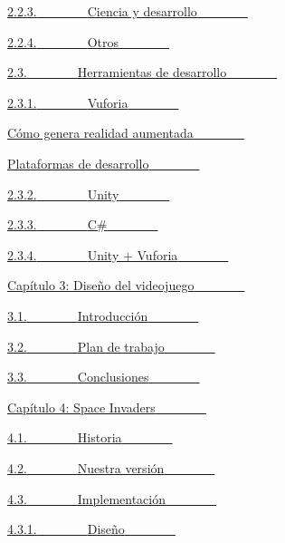 \hyperref[h.17dp8vu]{2.2.3.}\hyperref[h.17dp8vu]{~~~~~~~~}\hyperref[h.17dp8vu]{Ciencia
y desarrollo}\hyperref[h.17dp8vu]{~~~~~~~~}

\hyperref[h.3rdcrjn]{2.2.4.}\hyperref[h.3rdcrjn]{~~~~~~~~}\hyperref[h.3rdcrjn]{Otros}\hyperref[h.3rdcrjn]{~~~~~~~~}

\hyperref[h.26in1rg]{2.3.}\hyperref[h.26in1rg]{~~~~~~~~}\hyperref[h.26in1rg]{Herramientas
de desarrollo}\hyperref[h.26in1rg]{~~~~~~~~}

\hyperref[h.lnxbz9]{2.3.1.}\hyperref[h.lnxbz9]{~~~~~~~~}\hyperref[h.lnxbz9]{Vuforia}\hyperref[h.lnxbz9]{~~~~~~~~}

\hyperref[h.35nkun2]{Cómo genera realidad
aumentada}\hyperref[h.35nkun2]{~~~~~~~~}

\hyperref[h.1ksv4uv]{Plataformas de
desarrollo}\hyperref[h.1ksv4uv]{~~~~~~~~}

\hyperref[h.44sinio]{2.3.2.}\hyperref[h.44sinio]{~~~~~~~~}\hyperref[h.44sinio]{Unity}\hyperref[h.44sinio]{~~~~~~~~}

\hyperref[h.2jxsxqh]{2.3.3.}\hyperref[h.2jxsxqh]{~~~~~~~~}\hyperref[h.2jxsxqh]{C\#}\hyperref[h.2jxsxqh]{~~~~~~~~}

\hyperref[h.z337ya]{2.3.4.}\hyperref[h.z337ya]{~~~~~~~~}\hyperref[h.z337ya]{Unity
+ Vuforia}\hyperref[h.z337ya]{~~~~~~~~}

\hyperref[h.3j2qqm3]{Capítulo 3: Diseño del
videojuego}\hyperref[h.3j2qqm3]{~~~~~~~~}

\hyperref[h.1y810tw]{3.1.}\hyperref[h.1y810tw]{~~~~~~~~}\hyperref[h.1y810tw]{Introducción}\hyperref[h.1y810tw]{~~~~~~~~}

\hyperref[h.4i7ojhp]{3.2.}\hyperref[h.4i7ojhp]{~~~~~~~~}\hyperref[h.4i7ojhp]{Plan
de trabajo}\hyperref[h.4i7ojhp]{~~~~~~~~}

\hyperref[h.2xcytpi]{3.3.}\hyperref[h.2xcytpi]{~~~~~~~~}\hyperref[h.2xcytpi]{Conclusiones}\hyperref[h.2xcytpi]{~~~~~~~~}

\hyperref[h.1ci93xb]{Capítulo 4: Space
Invaders}\hyperref[h.1ci93xb]{~~~~~~~~}

\hyperref[h.3whwml4]{4.1.}\hyperref[h.3whwml4]{~~~~~~~~}\hyperref[h.3whwml4]{Historia}\hyperref[h.3whwml4]{~~~~~~~~}

\hyperref[h.2bn6wsx]{4.2.}\hyperref[h.2bn6wsx]{~~~~~~~~}\hyperref[h.2bn6wsx]{Nuestra
versión}\hyperref[h.2bn6wsx]{~~~~~~~~}

\hyperref[h.qsh70q]{4.3.}\hyperref[h.qsh70q]{~~~~~~~~}\hyperref[h.qsh70q]{Implementación}\hyperref[h.qsh70q]{~~~~~~~~}

\hyperref[h.3as4poj]{4.3.1.}\hyperref[h.3as4poj]{~~~~~~~~}\hyperref[h.3as4poj]{Diseño}\hyperref[h.3as4poj]{~~~~~~~~}

